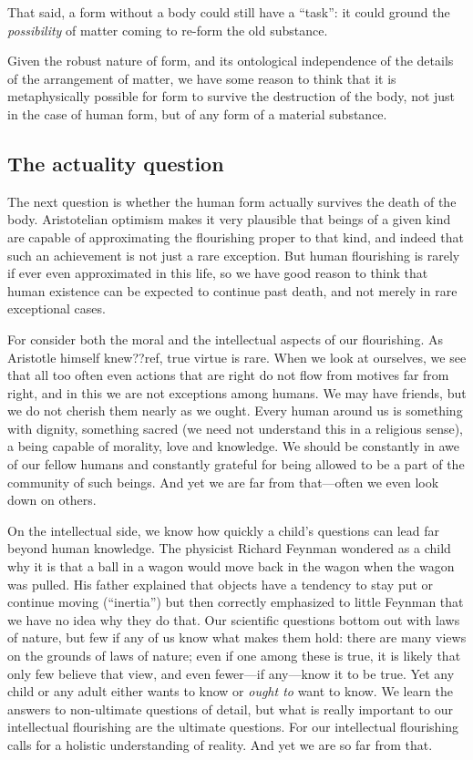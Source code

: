 That said, a form without a body could still have a ``task'': it could ground the \textit{possibility} of matter coming
to re-form the old substance. 

Given the robust nature of form, and its ontological independence of the details of the arrangement of matter, we have some 
reason to think that it is metaphysically possible for form to survive the destruction of the body, not just in the case of 
human form, but of any form of a material substance.

\subsection{The actuality question}
The next question is whether the human form actually survives the death of the body. Aristotelian optimism makes it very 
plausible that beings of a given kind are capable of approximating the flourishing proper to that kind, and indeed that such 
an achievement is not just a rare exception. But human flourishing is rarely if ever even approximated in this life, so we have 
good reason to think that human existence can be expected to continue past death, and not merely in rare exceptional cases. 

For consider both the moral and the intellectual aspects of our flourishing. As Aristotle himself knew??ref, true virtue is 
rare. When we look at ourselves, we see that all too often even actions that are right do not flow from motives far from 
right, and in this we are not exceptions among humans. We may have friends, but we do not cherish them nearly as we ought. 
Every human around us is something with dignity, something sacred (we need not understand this in a religious sense), a being capable of morality, love and knowledge. We should be constantly in awe of our fellow humans and constantly grateful for being allowed 
to be a part of the community of such beings. And yet we are far from that---often we even look down on others. 

On the intellectual side, we know how quickly a child's questions can lead far beyond human knowledge. The physicist 
Richard Feynman wondered as a child why it is that a ball in a wagon would move back in the wagon when the wagon was 
pulled. His father explained that objects have a tendency to stay put or continue moving (``inertia'') but then correctly
emphasized to little Feynman that we have no idea why they do that. Our scientific questions bottom out with laws of nature,
but few if any of us know what makes them hold: there are many views on the grounds of laws of nature; even if one among these is 
true, it is likely that only few believe that view, and even fewer---if any---know it to be true. Yet any child or any adult 
either wants to know or \textit{ought to} want to know. We learn the answers to non-ultimate questions of detail, but what is 
really important to our intellectual flourishing are the ultimate questions. For our intellectual flourishing calls for a holistic
understanding of reality. And yet we are so far from that.

